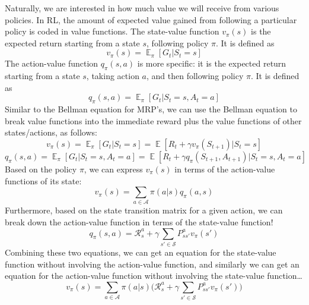 \documentclass{article}
\DeclareMathOperator{\EX}{\mathbb{E}}
\begin{document}
Naturally, we are interested in how much value we will receive from various policies. In RL, the amount of expected value gained from following a particular policy is coded in value functions. The state-value function $v_\pi(s)$ is the expected return starting from a state $s$, following policy $\pi$. It is defined as
\begin{equation}\label{eq:policy_state_value_definition}
v_\pi(s) = \EX_\pi[G_t | S_t = s]
\end{equation}
The action-value function $q_\pi(s, a)$ is more specific: it is the expected return starting from a state $s$, taking action $a$, and then following policy $\pi$. It is defined as
\begin{equation}\label{eq:policy_action_value_definition}
q_\pi(s, a) = \EX_\pi[G_t | S_t = s, A_t = a]
\end{equation}
Similar to the Bellman equation for MRP’s, we can use the Bellman equation to break value functions into the immediate reward plus the value functions of other states/actions, as follows:
\begin{equation}\label{eq:bellman_policy_state_value}
v_\pi(s) = \EX_\pi[G_t | S_t = s] = \EX[R_t + \gamma v_\pi(S_{t+1}) | S_t = s]
\end{equation}
\begin{equation}\label{eq:bellman_policy_action_value}
q_\pi(s, a) = \EX_\pi[G_t | S_t = s, A_t = a] = \EX[R_t + \gamma q_\pi(S_{t+1}, A_{t+1}) | S_t = s, A_t = a]
\end{equation}
Based on the policy $\pi$, we can express $v_\pi(s)$ in terms of the action-value functions of its state:
\begin{equation}\label{eq:policy_state_value_from_action_values}
v_\pi(s) = \sum_{a\in\mathcal{A}} \pi(a|s)q_\pi(a, s)
\end{equation}
Furthermore, based on the state transition matrix for a given action, we can break down the action-value function in terms of the state-value function!
\begin{equation}\label{eq:policy_action_value_from_state_values}
q_\pi(s, a) = \mathcal{R}^a_s + \gamma\sum_{s'\in\mathcal{S}}P^a_{ss'}v_\pi(s')
\end{equation}
Combining these two equations, we can get an equation for the state-value function without involving the action-value function, and similarly we can get an equation for the action-value function without involving the state-value function…
\begin{equation}\label{eq:recursive_policy_state_value_equation}
v_\pi(s) = \sum_{a\in\mathcal{A}} \pi(a|s)\bigg(\mathcal{R}^a_s + \gamma\sum_{s'\in\mathcal{S}}P^a_{ss'}v_\pi(s')\bigg)
\end{equation}
\end{document}
